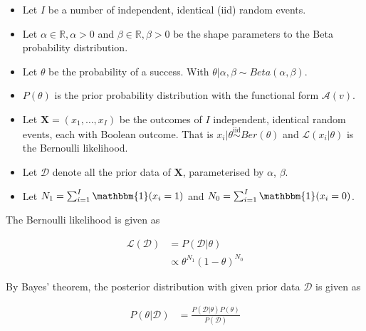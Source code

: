 \begin{itemize}
      \item Let $I$ be a number of independent, identical  (iid) random events.

      \item Let $\alpha \in \mathbb{R}, \alpha > 0$ and $\beta \in \mathbb{R}, \beta >0$ be the shape parameters to the Beta probability distribution.

      \item Let $\theta$ be the probability of a success. With $\theta | \alpha, \beta \sim Beta(\alpha, \beta)$.

      \item $P(\theta)$ is the prior probability distribution with the functional form $\mathcal{A}(v)$.

      \item Let $\boldsymbol{X} = (x_{1}, \dots, x_{I})$ be the outcomes of $I$ independent, identical random events, each with Boolean outcome. That is $x_{i} | \theta \overset{\text{iid}}{\sim} Ber(\theta)$ and $\mathcal{L}(x_{i} \vert \theta)$ is the Bernoulli likelihood.

      \item Let $\boldsymbol{\mathcal{D}}$ denote all the prior data of $\boldsymbol{X}$, parameterised by $\alpha$, $\beta$.

      \item Let $N_{1} = \sum_{i=1}^{I} \mathbbm{1}(x_{i} = 1)$ and $N_{0} = \sum_{i=1}^{I} \mathbbm{1}(x_{i} = 0)$.
\end{itemize}

The Bernoulli likelihood is given as

\begin{equation}
      \label{eq:probability:conjugate_priors:binom_likelihood:likelihood}
      \begin{split}
            \mathcal{L}(\boldsymbol{\mathcal{D}}) &=  P(\boldsymbol{\mathcal{D}} | \theta) \\
            &\propto \theta^{N_{1}}(1-\theta)^{N_{0}}
      \end{split}
\end{equation}

By Bayes' theorem, the posterior distribution with given prior data $\boldsymbol{\mathcal{D}}$ is given as

\begin{equation}
      \begin{split}
            \label{eq:probability:conjugate_priors:binom_likelihood:posterior}
            P(\theta \vert \boldsymbol{\mathcal{D}}) &= \frac{P(\boldsymbol{\mathcal{D}} | \theta) P(\theta)}{P(\boldsymbol{\mathcal{D}})}
      \end{split}
\end{equation}

